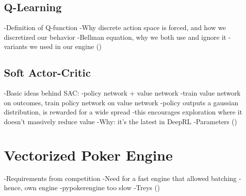 \subsection{Q-Learning}
-Definition of Q-function
-Why discrete action space is forced, and how we discretized our behavior
-Bellman equation, why we both use and ignore it
-variants we used in our engine
(\cite{SpinningUp2018})

\subsection{Soft Actor-Critic}
\cite{SAC_main}
-Basic ideas behind SAC:
    -policy network + value network
    -train value network on outcomes, train policy network on value network
    -policy outputs a gaussian distribution, is rewarded for a wide spread
    -this encourages exploration where it doesn't massively reduce value
-Why: it's the latest in DeepRL
-Parameters
(\cite{SpinningUp2018})


\section{Vectorized Poker Engine}
-Requirements from competition
-Need for a fast engine that allowed batching
    -hence, own engine
-pypokerengine too slow
-Treys (\cite{Treys})